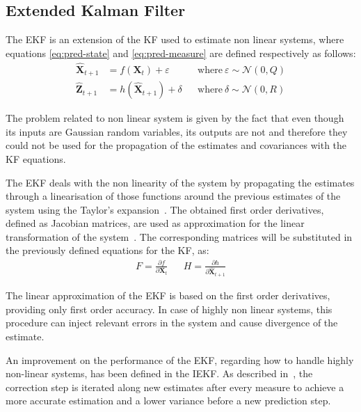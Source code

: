 \subsection{Extended Kalman Filter}

\noindent The \gls{EKF} is an extension of the \gls{KF} used to estimate non linear systems, where equations \eqref{eq:pred-state} and \eqref{eq:pred-measure} are defined respectively as follows:
\begin{align}
\hat{\mathbf{X}}_{t+1} & = f(\mathbf{X}_{t}) + \varepsilon &&
    \textrm{where}~\varepsilon \sim \mathcal{N}(0, Q)\\
\hat{\mathbf{Z}}_{t+1} & = h(\hat{\mathbf{X}}_{t+1}) + \delta &&
    \textrm{where}~\delta \sim \mathcal{N}(0, R)
\end{align}

The problem related to non linear system is given by the fact that even though its inputs are Gaussian random variables, its outputs are not and therefore they could not be used for the propagation of the estimates and covariances with the \gls{KF} equations.

The \gls{EKF} deals with the non linearity of the system by propagating the estimates through a linearisation of those functions around the previous estimates of the system using the Taylor's expansion~\cite{thrun_probabilistic_2005}.
The obtained first order derivatives, defined as Jacobian matrices, are used as approximation for the linear transformation of the system~\cite{1386886}.
\newcommand{\partialat}[2]{\frac{\partial {#1}}{\partial {#2}}}
The corresponding matrices will be substituted in the previously defined equations for the \gls{KF}, as:
\begin{align}
F = \partialat{f}{\mathbf{X}_{t}} & &
H = \partialat{h}{\hat{\mathbf{X}}_{t+1}}
\end{align}

The linear approximation of the \gls{EKF} is based on the first order derivatives, providing only first order accuracy. In case of highly non linear systems, this procedure can inject relevant errors in the system and cause divergence of the estimate.

An improvement on the performance of the \gls{EKF}, regarding how to handle highly non-linear systems, has been defined in the \gls{IEKF}. As described in~\cite{xu_adaptive_2014}, the correction step is iterated along new estimates after every measure to achieve a more accurate estimation and a lower variance before a new prediction step.


